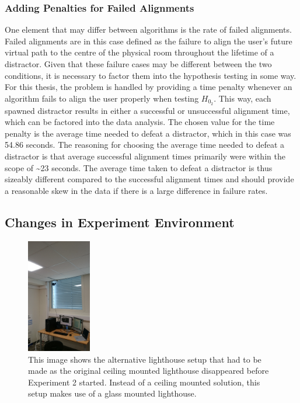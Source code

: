 \subsubsection{Adding Penalties for Failed Alignments}
One element that may differ between algorithms is the rate of failed alignments. Failed alignments are in this case defined as the failure to align the user's future virtual path to the centre of the physical room throughout the lifetime of a distractor. Given that these failure cases may be different between the two conditions, it is necessary to factor them into the hypothesis testing in some way. For this thesis, the problem is handled by providing a time penalty whenever an algorithm fails to align the user properly when testing $H_{0_2}$. This way, each spawned distractor results in either a successful or unsuccessful alignment time, which can be factored into the data analysis. The chosen value for the time penalty is the average time needed to defeat a distractor, which in this case was 54.86 seconds. The reasoning for choosing the average time needed to defeat a distractor is that average successful alignment times primarily were within the scope of \textasciitilde23 seconds. The average time taken to defeat a distractor is thus sizeably different compared to the successful alignment times and should provide a reasonable skew in the data if there is a large difference in failure rates. 


\subsection{Changes in Experiment Environment}\label{sec:ex2environmentchanges}
\begin{figure}[tbph]
    \centering
    \includegraphics[width=0.25\textwidth]{figures/images/experiment2EnvironmentChanges.jpg}
    \caption[Changes in Experiment Environment for Experiment 2]{This image shows the alternative lighthouse setup that had to be made as the original ceiling mounted lighthouse disappeared before Experiment 2 started. Instead of a ceiling mounted solution, this setup makes use of a glass mounted lighthouse.}
    \label{fig:ex2changedLighthouse}
\end{figure}


